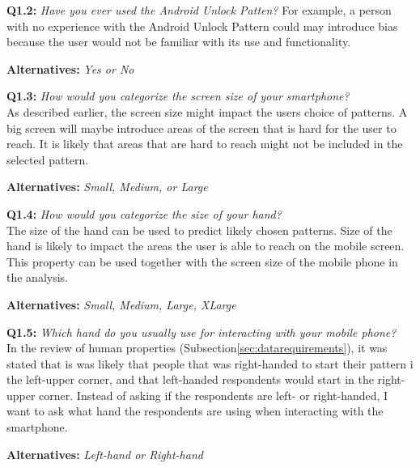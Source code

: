       {\bf Q1.2:} {\it Have you ever used the Android Unlock Patten?}
      For example, a person with no experience with the Android Unlock Pattern could may introduce bias because the user would not be familiar with its use and functionality. 
        \begin{enumerate*}
          \item[ ] {\bf Alternatives:} {\it Yes or No}
        \end{enumerate*}

      {\bf Q1.3:} {\it How would you categorize the screen size of your smartphone?} \\
      As described earlier, the screen size might impact the users choice of patterns. A big screen will maybe introduce areas of the screen that is hard for the user to reach. It is likely that areas that are hard to reach might not be included in the selected pattern.
        \begin{enumerate*}
          \item[ ] {\bf Alternatives:} {\it Small, Medium, or Large}
        \end{enumerate*}
    
       
      {\bf Q1.4:} {\it How would you categorize the size of your hand?} \\
      The size of the hand can be used to predict likely chosen patterns. Size of the hand is likely to impact the areas the user is able to reach on the mobile screen. This property can be used together with the screen size of the mobile phone in the analysis. 
        \begin{enumerate*}
          \item[ ] {\bf Alternatives:} {\it Small, Medium, Large, XLarge}
        \end{enumerate*}
     

      {\bf Q1.5:} {\it Which hand do you usually use for interacting with your mobile phone?} \\
      In the review of human properties (Subsection\ref{sec:datarequirements}), it was stated that is was likely that people that was right-handed to start their pattern i the left-upper corner, and that left-handed respondents would start in the right-upper corner. Instead of asking if the respondents are left- or right-handed, I want to ask what hand the respondents are using when interacting with the smartphone. 
        \begin{enumerate*}
          \item[ ] {\bf Alternatives:} {\it Left-hand or Right-hand}
        \end{enumerate*}

